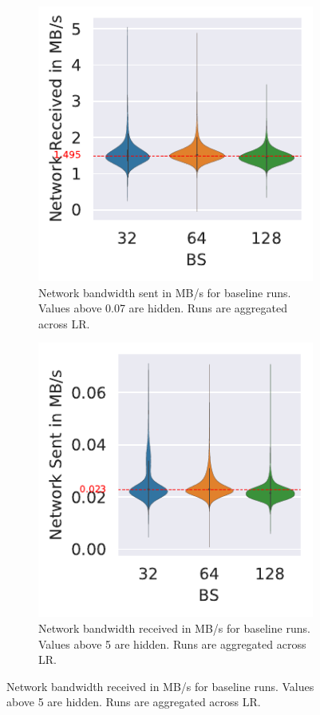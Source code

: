 \begin{figure}[h]
    \centering
    \begin{subfigure}[b]{0.475 \textwidth}
        \centering
        \caption{Network bandwidth sent in MB/s for baseline runs. Values above 0.07 are hidden. Runs are aggregated across LR.}
        \label{fig:net-sent_baseline}
        \includegraphics[width=\textwidth]{./figures/06_net-recv_baseline-16vCPUs-GAS-1.pdf}
    \end{subfigure}%
    \hfill
    \centering
    \begin{subfigure}[b]{0.475 \textwidth}
        \centering
        \caption{Network bandwidth received in MB/s for baseline runs. Values above 5 are hidden. Runs are aggregated across LR.}
        \label{fig:net-recv_baseline}
        \includegraphics[width=\textwidth]{./figures/06_net-sent_baseline-16vCPUs-GAS-1.pdf}

\end{subfigure}
\end{figure}
